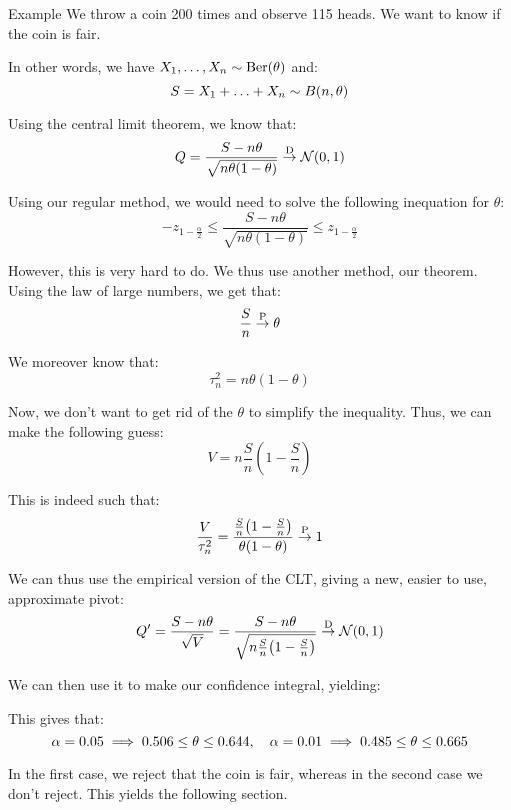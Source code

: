 \documentclass[a4paper]{article}
\begin{document}
\begin{parag}{Example}
    We throw a coin 200 times and observe 115 heads. We want to know if the coin is fair.

    In other words, we have $X_1, \ldots, X_n \followsdistr \text{Ber}\left(\theta\right)$ and: 
    \[S = X_1 + \ldots + X_n \followsdistr B\left(n, \theta\right)\]
    
    Using the central limit theorem, we know that: 
    \[Q = \frac{S - n \theta}{\sqrt{n \theta\left(1 - \theta\right)}} \over{\to}{D} \mathcal{N}\left(0, 1\right)\]
    
    Using our regular method, we would need to solve the following inequation for $\theta$: 
    \[-z_{1 - \frac{\alpha}{2}} \leq \frac{S - n \theta}{\sqrt{n \theta\left(1- \theta\right)}} \leq z_{1 - \frac{\alpha}{2}}\]
    
    However, this is very hard to do. We thus use another method, our theorem. Using the law of large numbers, we get that: 
    \[\frac{S}{n} \over{\to}{P} \theta\]
    
    We moreover know that: 
    \[\tau_n^2 = n \theta\left(1 - \theta\right)\]

    Now, we don't want to get rid of the $\theta$ to simplify the inequality. Thus, we can make the following guess: 
    \[V = n \frac{S}{n}\left(1 - \frac{S}{n}\right)\]
    
    This is indeed such that:
    \[\frac{V}{\tau^2_n} = \frac{\frac{S}{n}\left(1 - \frac{S}{n}\right)}{\theta\left(1 - \theta\right)} \over{\to}{P} 1\]
    
    We can thus use the empirical version of the CLT, giving a new, easier to use, approximate pivot: 
    \[Q' = \frac{S - n \theta}{\sqrt{V}} = \frac{S - n \theta}{\sqrt{n \frac{S}{n}\left(1 - \frac{S}{n}\right)}}\over{\to}{D} \mathcal{N}\left(0, 1\right)\]

    We can then use it to make our confidence integral, yielding: 

    This gives that:
    \[\alpha = 0.05 \implies 0.506 \leq \theta \leq 0.644, \mathspace \alpha = 0.01 \implies 0.485 \leq \theta \leq 0.665\]
    
    In the first case, we reject that the coin is fair, whereas in the second case we don't reject. This yields the following section.
\end{parag}
\end{document}

